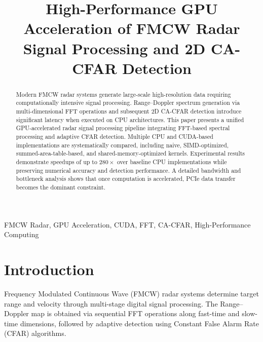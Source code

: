 \documentclass[conference, a4paper]{IEEEtran}
\begin{document}
\title{High-Performance GPU Acceleration of FMCW Radar Signal Processing and 2D CA-CFAR Detection}

\author{
\and
{}
\and
{}
}

\maketitle

\begin{abstract}
Modern FMCW radar systems generate large-scale high-resolution data requiring computationally intensive signal processing. 
Range–Doppler spectrum generation via multi-dimensional FFT operations and subsequent 2D CA-CFAR detection introduce significant latency when executed on CPU architectures. 
This paper presents a unified GPU-accelerated radar signal processing pipeline integrating FFT-based spectral processing and adaptive CFAR detection. 
Multiple CPU and CUDA-based implementations are systematically compared, including naive, SIMD-optimized, summed-area-table-based, and shared-memory-optimized kernels. 
Experimental results demonstrate speedups of up to $280\times$ over baseline CPU implementations while preserving numerical accuracy and detection performance. 
A detailed bandwidth and bottleneck analysis shows that once computation is accelerated, PCIe data transfer becomes the dominant constraint.
\end{abstract}

\begin{IEEEkeywords}
FMCW Radar, GPU Acceleration, CUDA, FFT, CA-CFAR, High-Performance Computing
\end{IEEEkeywords}

\section{Introduction}
Frequency Modulated Continuous Wave (FMCW) radar systems determine target range and velocity through multi-stage digital signal processing. The Range–Doppler map is obtained via sequential FFT operations along fast-time and slow-time dimensions, followed by adaptive detection using Constant False Alarm Rate (CFAR) algorithms. 
\end{document}
